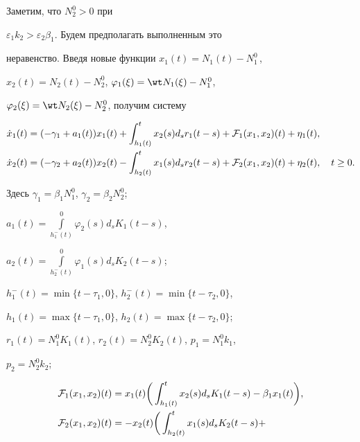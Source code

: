 \begin{exam}
Заметим, что $N_2^0>0$ при


$\varepsilon_1k_2>\varepsilon_2\beta_1$. Будем предполагать выполненным это


неравенство. Введя новые функции $x_1(t)=N_1(t)-N_1^0\,$,\,


$x_2(t)=N_2(t)-N_2^0$, $\varphi_1(\xi)=\wt N_1(\xi)-N_1^0$,


$\varphi_2(\xi)=\wt N_2(\xi)-N_2^0$, получим систему


\begin{equation}


\begin{split}


\Dot x_1(t)&=(-\gamma_1+a_1(t))x_1(t)+


\int_{h_1(t)}^t x_2(s)d_sr_1(t-s)+


{\cal F}_1(x_1,x_2)(t)+\eta_1(t),\\


%


\Dot x_2(t)&=(-\gamma_2+a_2(t))x_2(t)-


\int_{h_2(t)}^t x_1(s)d_sr_2(t-s)+


{\cal F}_2(x_1,x_2)(t)+\eta_2(t),\quad t\ge0.


\end{split}


\end{equation}


Здесь $\gamma_1=\beta_1N_1^0$, $\gamma_2=\beta_2N_2^0$;


$a_1(t)=\int\limits_{h_1^-(t)}^0\varphi_2(s)d_sK_1(t-s)$,


$a_2(t)=\int\limits_{h_2^-(t)}^0\varphi_1(s)d_sK_2(t-s)$;


$h_1^-(t)=\min\{t-\tau_1,0\}$, $h_2^-(t)=\min\{t-\tau_2,0\}$,


$h_1(t)=\max\{t-\tau_1,0\}$, $h_2(t)=\max\{t-\tau_2,0\}$;


$r_1(t)=N_1^0K_1(t)$, $r_2(t)=N_2^0K_2(t)$, $p_1=N_1^0k_1$,


$p_2=N_2^0k_2$;


\begin{align*}


{\cal F}_1(x_1,x_2)(t)&=


x_1(t)\bigg(\int_{h_1(t)}^tx_2(s)d_sK_1(t-s)-


\beta_1x_1(t)\bigg), \\


%


{\cal F}_2(x_1,x_2)(t)&=


-x_2(t)\bigg(\int_{h_2(t)}^tx_1(s)d_sK_2(t-s)+



\end{align*}
\end{exam}

